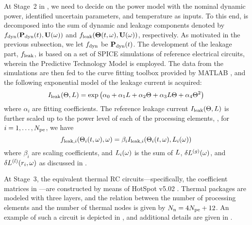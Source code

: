 At Stage~2 in , we need to decide on the power model with the nominal dynamic power, identified uncertain parameters, and temperature as inputs. To this end,  is decomposed into the sum of dynamic and leakage components denoted by $f_{\text{dyn}}(\mathbf{P}_{\text{dyn}}(t), \mathbf{U}(\omega))$ and $f_{\text{leak}}({\boldsymbol\Theta}(t, \omega), \mathbf{U}(\omega))$, respectively. As motivated in the previous subsection, we let $f_{\text{dyn}}$ be $\mathbf{P}_{\text{dyn}}(t)$. The development of the leakage part, $f_{\text{leak}}$, is based on a set of SPICE simulations of reference electrical circuits, wherein the Predictive Technology Model \cite{ptm} is employed. The data from the simulations are then fed to the curve fitting toolbox provided by MATLAB \cite{matlab}, and the following exponential model of the leakage current is acquired:
\begin{equation} \elabel{leakage-current}
  I_\leak(\T, \Leff) = \exp \left( \alpha_0 + \alpha_1 \Leff + \alpha_2 \T + \alpha_3 \Leff \T + \alpha_4 \T^2 \right)
\end{equation}
where $\alpha_i$ are fitting coefficients. The reference leakage current $I_{\text{leak}}(\Theta, L)$ is further scaled up to the power level of each of the processing elements, \ie, for $i = 1, \dotsc, {N_\text{pe}}$, we have
\[
  f_{\text{leak}, i}(\Theta_i(t, \omega), \omega) = \beta_i I_{\text{leak}, i}(\Theta_i(t, \omega), L_i(\omega))
\]
where $\beta_i$ are scaling coefficients, and $L_i(\omega)$ is the sum of $L$, ${\delta L^{(g)}}(\omega)$, and $\delta L^{(l)}(r_i, \omega)$ as discussed in .

At Stage~3, the equivalent thermal RC circuits---specifically, the coefficient matrices in ---are constructed by means of HotSpot v5.02 \cite{hotspot}. Thermal packages are modeled with three layers, and the relation between the number of processing elements and the number of thermal nodes is given by $N_\text{n} = 4 {N_\text{pe}} + 12$. An example of such a circuit is depicted in , and additional details are given in .
